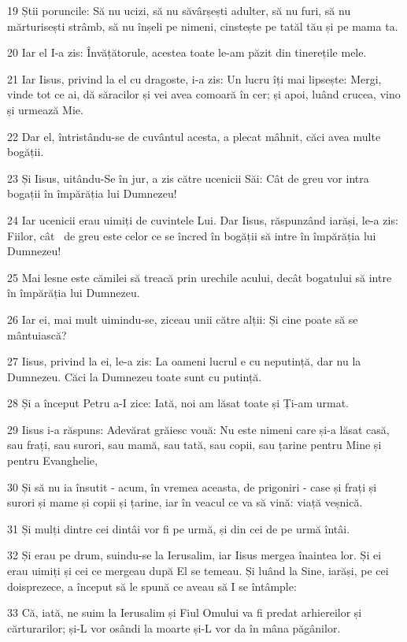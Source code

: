\par 19 Știi poruncile: Să nu ucizi, să nu săvârșești adulter, să nu furi, să nu mărturisești strâmb, să nu înșeli pe nimeni, cinstește pe tatăl tău și pe mama ta.
\par 20 Iar el I-a zis: Învățătorule, acestea toate le-am păzit din tinerețile mele.
\par 21 Iar Iisus, privind la el cu dragoste, i-a zis: Un lucru îți mai lipsește: Mergi, vinde tot ce ai, dă săracilor și vei avea comoară în cer; și apoi, luând crucea, vino și urmează Mie.
\par 22 Dar el, întristându-se de cuvântul acesta, a plecat mâhnit, căci avea multe bogății.
\par 23 Și Iisus, uitându-Se în jur, a zis către ucenicii Săi: Cât de greu vor intra bogații în împărăția lui Dumnezeu!
\par 24 Iar ucenicii erau uimiți de cuvintele Lui. Dar Iisus, răspunzând iarăși, le-a zis: Fiilor, cât  de greu este celor ce se încred în bogății să intre în împărăția lui Dumnezeu!
\par 25 Mai lesne este cămilei să treacă prin urechile acului, decât bogatului să intre în împărăția lui Dumnezeu.
\par 26 Iar ei, mai mult uimindu-se, ziceau unii către alții: Și cine poate să se mântuiască?
\par 27 Iisus, privind la ei, le-a zis: La oameni lucrul e cu neputință, dar nu la Dumnezeu. Căci la Dumnezeu toate sunt cu putință.
\par 28 Și a început Petru a-I zice: Iată, noi am lăsat toate și Ți-am urmat.
\par 29 Iisus i-a răspuns: Adevărat grăiesc vouă: Nu este nimeni care și-a lăsat casă, sau frați, sau surori, sau mamă, sau tată, sau copii, sau țarine pentru Mine și pentru Evanghelie,
\par 30 Și să nu ia însutit - acum, în vremea aceasta, de prigoniri - case și frați și surori și mame și copii și țarine, iar în veacul ce va să vină: viață veșnică.
\par 31 Și mulți dintre cei dintâi vor fi pe urmă, și din cei de pe urmă întâi.
\par 32 Și erau pe drum, suindu-se la Ierusalim, iar Iisus mergea înaintea lor. Și ei erau uimiți și cei ce mergeau după El se temeau. Și luând la Sine, iarăși, pe cei doisprezece, a început să le spună ce aveau să I se întâmple:
\par 33 Că, iată, ne suim la Ierusalim și Fiul Omului va fi predat arhiereilor și cărturarilor; și-L vor osândi la moarte și-L vor da în mâna păgânilor.
